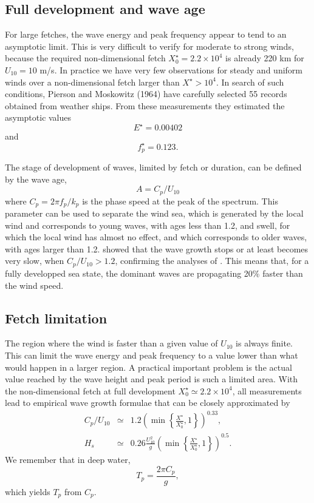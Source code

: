 \subsection{Full development and wave age}
For large fetches, the wave energy and peak frequency appear to tend to an asymptotic limit. 
This is very difficult to verify for moderate to strong winds, because the required non-dimensional fetch 
$X^\star_0=2.2 \times 10^4$ is already 220 km for $U_{10}= 10$ m/s. 
In practice we have very few observations for steady and uniform winds over a non-dimensional fetch larger than  $X^\star
> 10^4$. In search of such conditions, Pierson and Moskowitz
(1964\nocite{Pierson&Moskowitz1964}) have carefully selected 
55 records obtained from weather ships. From these measurements they estimated the asymptotic values  
\begin{equation}
E^\star=0.00402
 \end{equation}
 and
\begin{equation}
f_p^\star=0.123.
\end{equation}

The stage of development of waves, limited by fetch or duration, can be defined 
by the wave age, 
\begin{equation}
 A=C_p / U_{10}
\end{equation} where $C_p=2 \pi f_p/k_p$ is the phase speed at the peak of the spectrum. 
This parameter can be used to separate the wind sea, which is generated by the local wind and corresponds to 
young waves, with ages less than 1.2, and swell, for which the local wind has almost no effect, 
and which corresponds to older waves, with ages larger than 1.2. \cite{Donelan&al.1992} showed that 
the wave growth stops or at least becomes very slow, when  $C_p / U_{10} > 1.2$, confirming the analyses of \cite{Pierson&Moskowitz1964}. 
This means that, for a fully developped sea state, the dominant waves are propagating 20\% faster than the wind speed. 

\subsection{Fetch limitation}
The region where the wind is faster than a given value of  $U_{10}$ is always finite. This can limit the wave energy and peak frequency to a value 
lower than what would happen in a larger region. A practical important problem is the actual value reached by the wave height and peak period is 
such a limited area. With the non-dimensional fetch at full development $ X^\star_0 \simeq 2.2 \times 10^4$, all measurements lead to empirical 
wave growth formulae \citep{Elfouhaily&al.1997} that can be closely approximated by 
\begin{eqnarray}
   C_p/U_{10}  & \simeq &  1.2  \left(\min
   \left\{\frac{X^\star}{X^\star_0},1\right\}\right)^{0.33},\label{ageElf}\\
   H_s  & \simeq &  0.26 \frac{U_{10}^2}{g}\left(\min
   \left\{\frac{X^\star}{X^\star_0},1\right\}\right)^{0.5}.\label{Hs_fetch}
\end{eqnarray}
We remember that in deep water, 
\begin{equation}
T_p = \frac{2 \pi C_p}{g},
\end{equation}
which yields $T_p$ from $C_p$.

